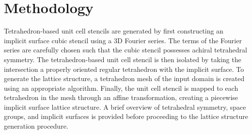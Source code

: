 \documentclass{article}
\begin{document}
\section{Methodology}
Tetrahedron-based unit cell stencils are generated by first constructing an implicit surface cubic stencil using a 3D Fourier series. The terms of the Fourier series are carefully chosen such that the cubic stencil possesses achiral tetrahedral symmetry. The tetrahedron-based unit cell stencil is then isolated by taking the intersection a properly oriented regular tetrahedron with the implicit surface. To generate the lattice structure, a tetrahedron mesh of the input domain is created using an appropriate algorithm. Finally, the unit cell stencil is mapped to each tetrahedron in the mesh through an affine transformation, creating a piecewise implicit surface lattice structure. A brief overview of tetrahedral symmetry, space groups, and implicit surfaces is provided before proceeding to the lattice structure generation procedure.
\end{document}
